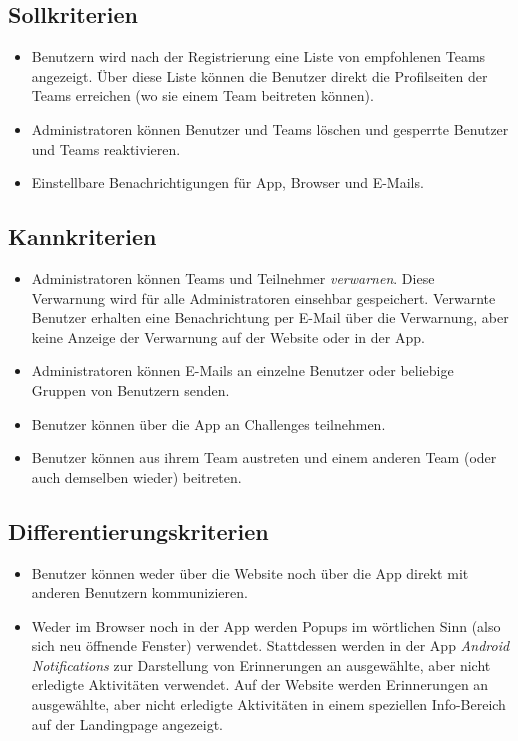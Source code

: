 \documentclass[10pt,a4paper]{article}
\begin{document}
	\subsection{Sollkriterien}
	\begin{itemize}
			\item Benutzern wird nach der Registrierung eine Liste von empfohlenen Teams angezeigt. Über diese Liste können die Benutzer direkt die Profilseiten der Teams erreichen (wo sie einem Team beitreten können).
			\item Administratoren können Benutzer und Teams löschen und gesperrte Benutzer und Teams reaktivieren.
			\item Einstellbare Benachrichtigungen für App, Browser und E-Mails.
		\end{itemize}
	\subsection{Kannkriterien}
	\begin{itemize}
                        \item Administratoren können Teams und Teilnehmer \emph{verwarnen}. Diese Verwarnung wird für alle Administratoren einsehbar gespeichert. Verwarnte Benutzer erhalten eine Benachrichtung per E-Mail über die Verwarnung, aber keine Anzeige der Verwarnung auf der Website oder in der App.
			\item Administratoren können E-Mails an einzelne Benutzer oder beliebige Gruppen von Benutzern senden.
                        \item Benutzer können über die App an Challenges teilnehmen.
                        \item Benutzer können aus ihrem Team austreten und einem anderen Team (oder auch demselben wieder) beitreten.
	\end{itemize}
	\subsection{Differentierungskriterien}
	\begin{itemize}
		\item Benutzer können weder über die Website noch über die App direkt mit anderen Benutzern kommunizieren.
		\item Weder im Browser noch in der App werden Popups im wörtlichen Sinn (also sich neu öffnende Fenster) verwendet. Stattdessen werden in der App \emph{Android Notifications} zur Darstellung von Erinnerungen an ausgewählte, aber nicht erledigte Aktivitäten verwendet. Auf der Website werden Erinnerungen an ausgewählte, aber nicht erledigte Aktivitäten in einem speziellen Info-Bereich auf der Landingpage angezeigt. 
	\end{itemize}
\end{document}
